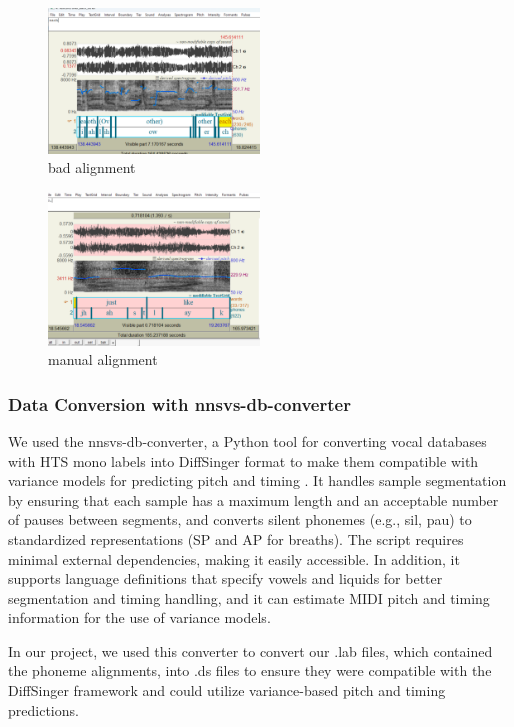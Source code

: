\documentclass[a4paper]{article}
\begin{document}
	\begin{figure}[htbp]
		\centering
		\includegraphics[width=0.5\textwidth]{graphics/bad_alignment.png}
		\caption{bad alignment}
		\label{fig:bild2}
	\end{figure}
	
	\begin{figure}[htbp]
		\centering
		\includegraphics[width=0.5\textwidth]{graphics/manual_alignment.png}
		\caption{manual alignment}
		\label{fig:bild3}
	\end{figure}
	
	\subsubsection{Data Conversion with nnsvs-db-converter}
	We used the nnsvs-db-converter, a Python tool for converting vocal databases with HTS mono labels into DiffSinger format to make them compatible with variance models for predicting pitch and timing \cite{nnsvsdbconverter}. It handles sample segmentation by ensuring that each sample has a maximum length and an acceptable number of pauses between segments, and converts silent phonemes (e.g., sil, pau) to standardized representations (SP and AP for breaths). The script requires minimal external dependencies, making it easily accessible. In addition, it supports language definitions that specify vowels and liquids for better segmentation and timing handling, and it can estimate MIDI pitch and timing information for the use of variance models.
	
	In our project, we used this converter to convert our .lab files, which contained the phoneme alignments, into .ds files to ensure they were compatible with the DiffSinger framework and could utilize variance-based pitch and timing predictions.
	
\end{document}
